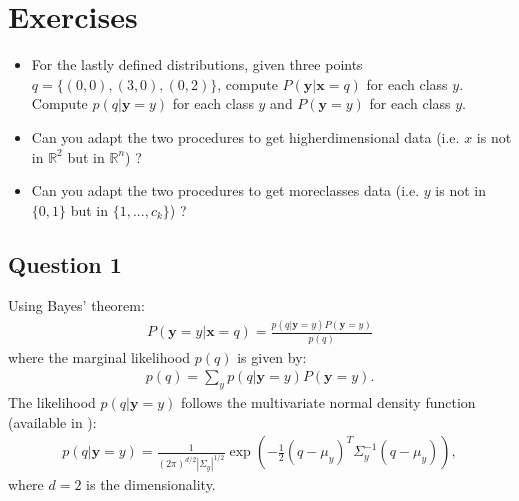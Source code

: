 \documentclass[letterpaper,10pt,english]{jupyterBook}
\begin{document}
\section{Exercises}
\label{\detokenize{06:exercises}}\begin{itemize}
\item {} 
\sphinxAtStartPar
For the lastly defined distributions, given three points \(q=\{(0, 0), (3, 0), (0, 2)\}\), compute \(P(\mathbf{y}| \mathbf{x}=q)\) for each class \(y\). Compute \(p(q|\mathbf{y}=y)\) for each class \(y\) and \(P(\mathbf{y}=y)\) for each class \(y\).

\item {} 
\sphinxAtStartPar
Can you adapt the two procedures to get higher\sphinxhyphen{}dimensional data (i.e. \(x\) is not in \(\mathbb{R}^2\) but in \(\mathbb{R}^n\)) ?

\item {} 
\sphinxAtStartPar
Can you adapt the two procedures to get more\sphinxhyphen{}classes data (i.e. \(y\) is not in \(\{0, 1\}\) but in \(\{1,...,c_{k}\}\)) ?

\end{itemize}


\subsection{Question 1}
\label{\detokenize{06:question-1}}
\sphinxAtStartPar
Using Bayes’ theorem:
\begin{equation*}
\begin{split}P(\mathbf{y}= y | \mathbf{x} = q) = \frac{p(q | \mathbf{y} = y) P(\mathbf{y} = y)}{p(q)}\end{split}
\end{equation*}
\sphinxAtStartPar
where the marginal likelihood \(p(q)\) is given by:
\begin{equation*}
\begin{split}p(q) = \sum_{y} p(q | \mathbf{y} = y) P(\mathbf{y} = y).\end{split}
\end{equation*}
\sphinxAtStartPar
The likelihood \(p(q | \mathbf{y} = y)\) follows the multivariate normal density function (available in ):
\begin{equation*}
\begin{split}p(q | \mathbf{y} = y) = \frac{1}{(2\pi)^{d/2} |\Sigma_y|^{1/2}} \exp\left(-\frac{1}{2} (q - \mu_y)^T \Sigma_y^{-1} (q - \mu_y)\right),\end{split}
\end{equation*}
\sphinxAtStartPar
where \(d = 2\) is the dimensionality.
\end{document}
